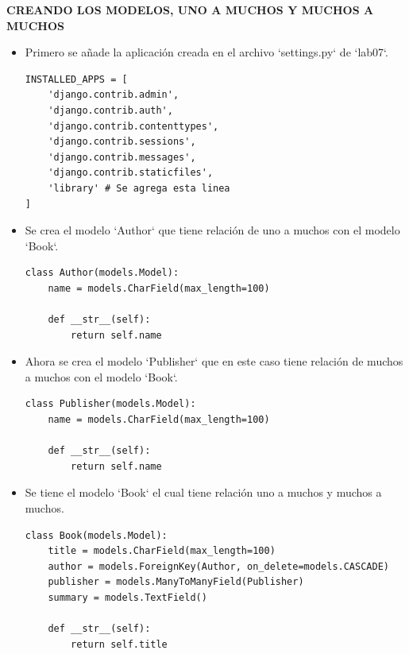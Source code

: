 \documentclass{article}
\begin{document}
\vspace{2\baselineskip}

\textbf{CREANDO LOS MODELOS, UNO A MUCHOS Y MUCHOS A MUCHOS}

\vspace{\baselineskip}

\begin{itemize}
\item Primero se añade la aplicación creada en el archivo `settings.py` de `lab07`.

\begin{lstlisting}[style=python]
INSTALLED_APPS = [
    'django.contrib.admin',
    'django.contrib.auth',
    'django.contrib.contenttypes',
    'django.contrib.sessions',
    'django.contrib.messages',
    'django.contrib.staticfiles',
    'library' # Se agrega esta linea
]
\end{lstlisting}

\item Se crea el modelo `Author` que tiene relación de uno a muchos con el modelo `Book`.

\begin{lstlisting}[style=python]
class Author(models.Model):
    name = models.CharField(max_length=100)

    def __str__(self):
        return self.name
\end{lstlisting}

\item Ahora se crea el modelo `Publisher` que en este caso tiene relación de muchos a muchos con el modelo `Book`.

\begin{lstlisting}[style=python]
class Publisher(models.Model):
    name = models.CharField(max_length=100)

    def __str__(self):
        return self.name
\end{lstlisting}

\item Se tiene el modelo `Book` el cual tiene relación uno a muchos y muchos a muchos.

\begin{lstlisting}[style=python]
class Book(models.Model):
    title = models.CharField(max_length=100)
    author = models.ForeignKey(Author, on_delete=models.CASCADE)
    publisher = models.ManyToManyField(Publisher)
    summary = models.TextField()

    def __str__(self):
        return self.title
\end{lstlisting}


\end{itemize}
\end{document}
